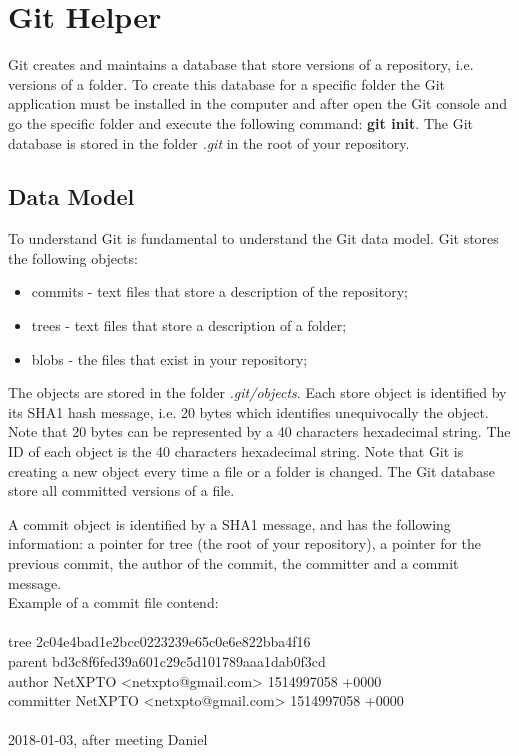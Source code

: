 \chapter{Git Helper}

Git creates and maintains a database that store versions of a repository, i.e. versions of a folder.
To create this database for a specific folder the Git application must be installed in the computer and after open the Git console and go the specific folder and execute the following command: \textbf{git init}.
The Git database is stored in the folder \emph{.git} in the root of your repository.

\section{Data Model}

To understand Git is fundamental to understand the Git data model.
Git stores the following objects:

\begin{itemize}
    \item[\textbullet] {commits - text files that store a description of the repository;}
    \item[\textbullet] {trees - text files that store a description of a folder;}
    \item[\textbullet] {blobs - the files that exist in your repository;}
\end{itemize}

The objects are stored in the folder \emph{.git/objects}. Each store object is identified by its SHA1 hash message, i.e. 20 bytes which identifies unequivocally the object. Note that 20 bytes can be represented by a 40 characters hexadecimal string. The ID of each object is the 40 characters hexadecimal string. Note that Git is creating a new object every time a file or a folder is changed. The Git database store all committed versions of a file.

A commit object is identified by a SHA1 message, and has the following information: a pointer for tree (the root of your repository), a pointer for the previous commit, the author of the commit, the committer and a commit message.\\
%
Example of a commit file contend:\\
\\
tree 2c04e4bad1e2bcc0223239e65c0e6e822bba4f16\\
parent bd3c8f6fed39a601c29c5d101789aaa1dab0f3cd\\
author NetXPTO <netxpto@gmail.com> 1514997058 +0000\\
committer NetXPTO <netxpto@gmail.com> 1514997058 +0000\\
\\
2018-01-03, after meeting Daniel\\

